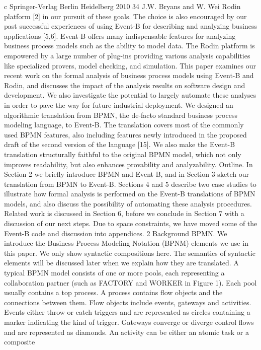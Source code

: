 c Springer-Verlag Berlin Heidelberg 2010
34 J.W. Bryans and W. Wei
Rodin platform [2] in our pursuit of these goals. The choice is also encouraged
by our past successful experiences of using Event-B for describing and analyzing business applications [5,6]. Event-B offers many indispensable features for
analyzing business process models such as the ability to model data. The Rodin
platform is empowered by a large number of plug-ins providing various analysis
capabilities like specialized provers, model checking, and simulation.
This paper examines our recent work on the formal analysis of business process models using Event-B and Rodin, and discusses the impact of the analysis
results on software design and development. We also investigate the potential to
largely automate these analyses in order to pave the way for future industrial
deployment. We designed an algorithmic translation from BPMN, the de-facto
standard business process modeling language, to Event-B. The translation covers most of the commonly used BPMN features, also including features newly
introduced in the proposed draft of the second version of the language [15]. We
also make the Event-B translation structurally faithful to the original BPMN
model, which not only improves readability, but also enhances provability and
analyzability.
Outline. In Section 2 we briefly introduce BPMN and Event-B, and in Section 3
sketch our translation from BPMN to Event-B. Sections 4 and 5 describe two
case studies to illustrate how formal analysis is performed on the Event-B translations of BPMN models, and also discuss the possibility of automating these
analysis procedures. Related work is discussed in Section 6, before we conclude
in Section 7 with a discussion of our next steps. Due to space constraints, we
have moved some of the Event-B code and discussion into appendices.
2 Background
BPMN. We introduce the Business Process Modeling Notation (BPNM) elements we use in this paper. We only show syntactic compositions here. The
semantics of syntactic elements will be discussed later when we explain how
they are translated.
A typical BPMN model consists of one or more pools, each representing a collaboration partner (such as FACTORY and WORKER in Figure 1). Each pool usually
contains a top process. A process contains flow objects and the connections between them. Flow objects include events, gateways and activities. Events either
throw or catch triggers and are represented as circles containing a marker indicating the kind of trigger. Gateways converge or diverge control flows and are
represented as diamonds. An activity can be either an atomic task or a composite
